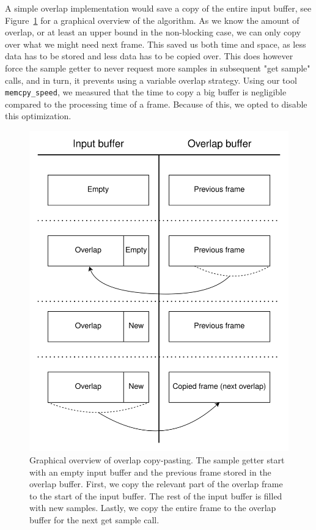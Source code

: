 \documentclass[a4paper,10pt,twocolumn]{article}
\begin{document}
A simple overlap implementation would save a copy of the entire input buffer, see Figure~\ref{fig:overlapgraph} for a graphical overview of the algorithm. As we know the amount of overlap, or at least an upper bound in the non-blocking case, we can only copy over what we might need next frame. This saved us both time and space, as less data has to be stored and less data has to be copied over. This does however force the sample getter to never request more samples in subsequent "get sample" calls, and in turn, it prevents using a variable overlap strategy. Using our tool \texttt{memcpy\_speed}, we measured that the time to copy a big buffer is negligible compared to the processing time of a frame. Because of this, we opted to disable this optimization.%
%
\begin{figure}[h]
    \centering
    \includegraphics[width=\linewidth]{fig/overlap.png}
    \caption{Graphical overview of overlap copy-pasting. The sample getter start with an empty input buffer and the previous frame stored in the overlap buffer. First, we copy the relevant part of the overlap frame to the start of the input buffer. The rest of the input buffer is filled with new samples. Lastly, we copy the entire frame to the overlap buffer for the next get sample call.}
    \label{fig:overlapgraph}
\end{figure}
\end{document}
